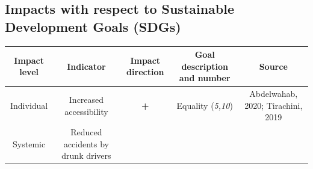 \documentclass[
]{book}
\begin{document}
\hypertarget{impacts-with-respect-to-sustainable-development-goals-sdgs-45}{%
\subsection*{Impacts with respect to Sustainable Development Goals (SDGs)}\label{impacts-with-respect-to-sustainable-development-goals-sdgs-45}}

\begin{longtable}[]{@{}ccccc@{}}
\toprule
\begin{minipage}[b]{0.17\columnwidth}\centering
Impact level\strut
\end{minipage} & \begin{minipage}[b]{0.16\columnwidth}\centering
Indicator\strut
\end{minipage} & \begin{minipage}[b]{0.17\columnwidth}\centering
Impact direction\strut
\end{minipage} & \begin{minipage}[b]{0.17\columnwidth}\centering
Goal description and number\strut
\end{minipage} & \begin{minipage}[b]{0.17\columnwidth}\centering
Source\strut
\end{minipage}\tabularnewline
\midrule
\endhead
\begin{minipage}[t]{0.17\columnwidth}\centering
Individual\strut
\end{minipage} & \begin{minipage}[t]{0.16\columnwidth}\centering
Increased accessibility\strut
\end{minipage} & \begin{minipage}[t]{0.17\columnwidth}\centering
\textbf{+}\strut
\end{minipage} & \begin{minipage}[t]{0.17\columnwidth}\centering
Equality (\emph{5,10})\strut
\end{minipage} & \begin{minipage}[t]{0.17\columnwidth}\centering
Abdelwahab, 2020; Tirachini, 2019\strut
\end{minipage}\tabularnewline
\begin{minipage}[t]{0.17\columnwidth}\centering
Systemic\strut
\end{minipage} & \begin{minipage}[t]{0.16\columnwidth}\centering
Reduced accidents by drunk drivers\strut

\end{minipage}
\end{longtable}
\end{document}
